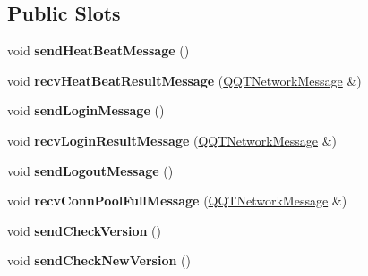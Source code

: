 \subsection*{Public Slots}
\begin{DoxyCompactItemize}
\item 
\mbox{\label{class_q_q_t_cloud_protocol_ad9d6015e532208b154a2e9a4b41ef94b}} 
void {\bfseries send\+Heat\+Beat\+Message} ()
\item 
\mbox{\label{class_q_q_t_cloud_protocol_a8062632b101198b71f915b11fc2d60a7}} 
void {\bfseries recv\+Heat\+Beat\+Result\+Message} (\mbox{\hyperlink{class_q_q_t_network_message}{Q\+Q\+T\+Network\+Message}} \&)
\item 
\mbox{\label{class_q_q_t_cloud_protocol_ab77cc8f72c7ad12b05932395262ea2a7}} 
void {\bfseries send\+Login\+Message} ()
\item 
\mbox{\label{class_q_q_t_cloud_protocol_a2c3df10818d4c7e928d96d3c6a99a6bd}} 
void {\bfseries recv\+Login\+Result\+Message} (\mbox{\hyperlink{class_q_q_t_network_message}{Q\+Q\+T\+Network\+Message}} \&)
\item 
\mbox{\label{class_q_q_t_cloud_protocol_ad62317bf0691e4d7e773a15ba72b055c}} 
void {\bfseries send\+Logout\+Message} ()
\item 
\mbox{\label{class_q_q_t_cloud_protocol_af3969f24591597937ad2cfb1b351759c}} 
void {\bfseries recv\+Conn\+Pool\+Full\+Message} (\mbox{\hyperlink{class_q_q_t_network_message}{Q\+Q\+T\+Network\+Message}} \&)
\item 
\mbox{\label{class_q_q_t_cloud_protocol_a9e2dd926773d82f7d5ff3c755002f5a4}} 
void {\bfseries send\+Check\+Version} ()
\item 
\mbox{\label{class_q_q_t_cloud_protocol_a0079235606d4e57d5a2e016fa244e33a}} 
void {\bfseries send\+Check\+New\+Version} ()
\item 
\mbox{\label{class_q_q_t_cloud_protocol_abf7963a96439e3d5c4df5f437c4907da}} 

\end{DoxyCompactItemize}
